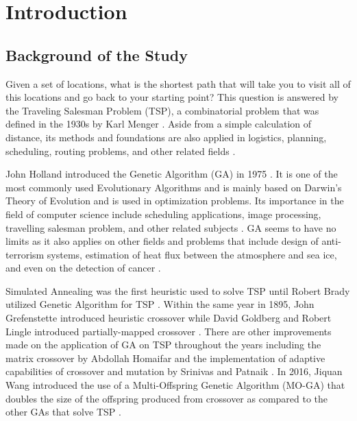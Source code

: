 \chapter{Introduction}
\label{chap:intro}

\section{Background of the Study}
		\indent \indent Given a set of locations, what is the shortest path that will take you to visit all of this locations and go back to your starting point? This question is answered by the Traveling Salesman Problem (TSP), a combinatorial problem that was defined in the 1930s by Karl Menger \cite{salvador2010traveling,brucato2013traveling,papadimitriou1977euclidean}. Aside from a simple calculation of distance, its methods and foundations are also applied in logistics, planning, scheduling, routing problems, and other related fields \cite{narwadi2017application}. \par 

John Holland introduced the Genetic Algorithm (GA) in 1975 \cite{reeves2003genetic}. It is one of the most commonly used Evolutionary Algorithms and  is mainly based on Darwin's Theory of Evolution and is used in optimization problems. Its importance in the field of computer science include scheduling applications, image processing, travelling salesman problem, and other related subjects \cite{maimon1998genetic,dos2014evolutionary,larranaga1999genetic}. GA seems to have no limits as it also applies on other fields and problems that include design of anti-terrorism systems, estimation of heat flux between the atmosphere and sea ice, and even on the detection of cancer \cite{buurman2009reducing,stanislawska2015genetic,fitzgerald2015integrated}.

		Simulated Annealing was the first heuristic used to solve TSP until Robert Brady utilized Genetic Algorithm for TSP \cite{larranaga1999genetic,brady1985optimization}. Within the same year in 1895, John Grefenstette introduced heuristic crossover while David Goldberg and Robert Lingle introduced partially-mapped crossover \cite{grefenstette1985genetic,goldberg1985alleles}. There are other improvements made on the application of GA on TSP throughout the years including the matrix crossover by Abdollah Homaifar and the implementation of adaptive capabilities of crossover and mutation by Srinivas and Patnaik \cite{homaifar1992schema,srinivas1994adaptive}. In 2016, Jiquan Wang introduced the use of a Multi-Offspring Genetic Algorithm (MO-GA) that doubles the size of the offspring produced from crossover as compared to the other GAs that solve TSP \cite{wang2016multi}.\par

